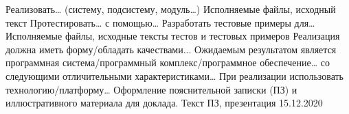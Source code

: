 {      {Реализовать… (систему, подсистему, модуль…)}
      {Исполняемые файлы, исходный текст}
      {}{}
    \projecttask{\projectsubtasknum}
      {Протестировать… с помощью…}
      {}
      {}{}
    \projecttask{\projectsubtasknum}
      {Разработать тестовые примеры для… }
      {Исполняемые файлы, исходные тексты тестов и тестовых примеров}
      {}{}
    \projecttask{\projectsubtasknum}
      {Реализация должна иметь форму/обладать качествами...}
      {}
      {}{}
    \projecttask{\projectsubtasknum}
      {Ожидаемым результатом является программная система/программный комплекс/программное обеспечение… со следующими отличительными характеристиками…}
      {}
      {}{}
    \projecttask{\projectsubtasknum}
      {При реализации использовать технологию/платформу…}
      {}
      {}{}
  \projecttask{\projecttasknum}
    {Оформление пояснительной записки (ПЗ) и иллюстративного материала для доклада.}
    {Текст ПЗ, презентация}
    {15.12.2020}{}
}

\taskliterature{
\nocite{Sychev}
\nocite{Sokolov}
\nocite{Gaidaenko}
}




\consultantrspzapproval{}


\authorpzapproval{}
\consultantpzapproval{}

